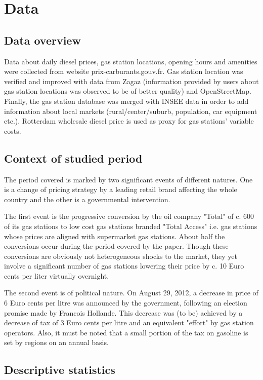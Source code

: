 \documentclass[11pt]{article}
\begin{document}
\section{Data}

\subsection{Data overview}

Data about daily diesel prices, gas station locations, opening hours and amenities were collected from website prix-carburants.gouv.fr. Gas station location was verified and improved with data from Zagaz (information provided by users about gas station locations was observed to be of better quality) and OpenStreetMap. Finally, the gas station database was merged with INSEE data in order to add information about local markets (rural/center/suburb, population, car equipment etc.). Rotterdam wholesale diesel price is used as proxy for gas stations' variable costs.

\subsection{Context of studied period}

The period covered is marked by two significant events of different natures. One is a change of pricing strategy by a leading retail brand affecting the whole country and the other is a governmental intervention.

The first event is the progressive conversion by the oil company "Total" of c. 600 of its gas stations to low cost gas stations branded "Total Access" i.e. gas stations whose prices are aligned with supermarket gas stations. About half the conversions occur during the period covered by the paper. Though these conversions are obviously not heterogeneous shocks to the market, they yet involve a significant number of gas stations lowering their price by c. 10 Euro cents per liter virtually overnight.

The second event is of political nature. On August 29, 2012, a decrease in price of 6 Euro cents per litre was announced by the government, following an election promise made by Francois Hollande. This decrease was (to be) achieved by a decrease of tax of 3 Euro cents per litre and an equivalent "effort" by gas station operators. Also, it must be noted that a small portion of the tax on gasoline is set by regions on an annual basis.

\subsection{Descriptive statistics}
\end{document}
